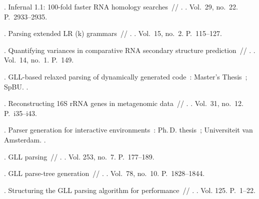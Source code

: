 \begin{thebibliography}{10}
	. Infernal 1.1: 100-fold faster RNA
	homology searches~// . \BibDash
	. \BibDash
	\newblock Vol.~29, no.~22. \BibDash
	\newblock P.~2933--2935.
	
	. Parsing extended {LR} (k)
	grammars~// . \BibDash
	. \BibDash
	\newblock Vol.~15, no.~2. \BibDash
	\newblock P.~115--127.
	
	. 
	Quantifying variances in comparative RNA secondary structure prediction~//
	\href{http://dx.doi.org/10.1186/1471-2105-14-149}{}. \BibDash
	. \BibDash
	\newblock Vol.~14, no.~1. \BibDash
	\newblock P.~149.
	
	. {GLL}-based relaxed parsing of dynamically
	generated code~: Master’s Thesis~; SpBU. \BibDash
	.
	
	.
	Reconstructing 16S rRNA genes in metagenomic data~// . \BibDash
	. \BibDash
	\newblock Vol.~31, no.~12. \BibDash
	\newblock P.~i35--i43.
	
	. Parser generation for interactive environments~:
	Ph.\,D. thesis~; Universiteit van Amsterdam. \BibDash
	.
	
	. {GLL} parsing~//
	. \BibDash
	. \BibDash
	\newblock Vol. 253, no.~7. \BibDash
	\newblock P.~177--189.
	
	. {GLL} parse-tree generation~//
	. \BibDash
	. \BibDash
	\newblock Vol.~78, no.~10. \BibDash
	\newblock P.~1828--1844.
	
	. Structuring the {GLL} parsing
	algorithm for performance~// .
	\BibDash
	. \BibDash
	\newblock Vol. 125. \BibDash
	\newblock P.~1--22.
	

\end{thebibliography}
